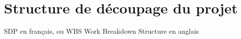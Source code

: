 \chapter{Structure de découpage du projet}

SDP en français, ou WBS Work Breakdown Structure en anglais